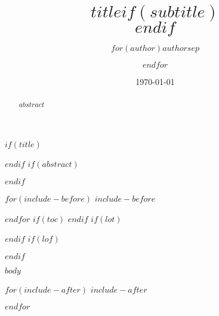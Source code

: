 \documentclass[$if(fontsize)$$fontsize$,$endif$$if(lang)$$lang$,$endif$$if(papersize)$$papersize$,$endif$$for(classoption)$$classoption$$sep$,$endfor$]{$documentclass$}
\title{$title$$if(subtitle)$\\\vspace{0.5em}{\large $subtitle$}$endif$}
\author{$for(author)$$author$$sep$ \and $endfor$}
\date{\today}
\theoremstyle{definition}
\numberwithin{definition}{section}
\theoremstyle{plain}
\numberwithin{theorem}{section}
\theoremstyle{remark}
\numberwithin{theorem}{section}
\theoremstyle{plain}
\numberwithin{lemma}{section}
\numberwithin{figure}{section}
\begin{document}
$if(title)$
\maketitle
$endif$
$if(abstract)$
\begin{abstract}
$abstract$
\end{abstract}
\pagebreak
\null
\thispagestyle{empty}
\addtocounter{page}{-1}
\pagebreak
$endif$

$for(include-before)$
$include-before$

$endfor$
$if(toc)$
{
\hypersetup{linkcolor=black}
\setcounter{tocdepth}{$toc-depth$}
\tableofcontents
}
$endif$
$if(lot)$
\listoftables
$endif$
$if(lof)$
\listoffigures
$endif$
\newcommand{\sectionbreak}{\clearpage}

$body$

$for(include-after)$
$include-after$

$endfor$
\end{document}
